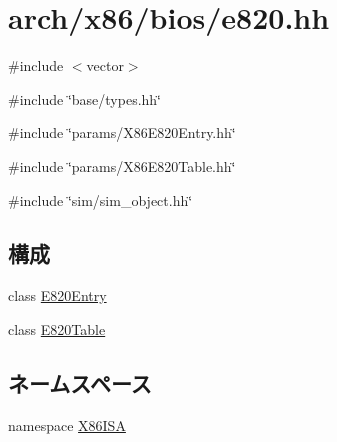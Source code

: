 \hypertarget{e820_8hh}{
\section{arch/x86/bios/e820.hh}
\label{e820_8hh}
}
{\ttfamily \#include $<$vector$>$}\par
{\ttfamily \#include \char`\"{}base/types.hh\char`\"{}}\par
{\ttfamily \#include \char`\"{}params/X86E820Entry.hh\char`\"{}}\par
{\ttfamily \#include \char`\"{}params/X86E820Table.hh\char`\"{}}\par
{\ttfamily \#include \char`\"{}sim/sim\_\-object.hh\char`\"{}}\par
\subsection*{構成}
\begin{DoxyCompactItemize}
\item 
class \hyperlink{classX86ISA_1_1E820Entry}{E820Entry}
\item 
class \hyperlink{classX86ISA_1_1E820Table}{E820Table}
\end{DoxyCompactItemize}
\subsection*{ネームスペース}
\begin{DoxyCompactItemize}
\item 
namespace \hyperlink{namespaceX86ISA}{X86ISA}
\end{DoxyCompactItemize}
